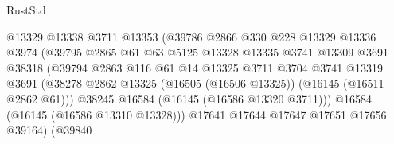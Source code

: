 \begin{lexlean}{RustStd}
\begin{coremodule}
                                        @13329
                                        @13338
                                        @3711
                                        @13353
                                        (@39786
                                          @2866
                                          @330
                                          @228
                                          @13329
                                          @13336
                                          @3974
                                          (@39795
                                            @2865
                                            @61
                                            @63
                                            @5125
                                            @13328
                                            @13335
                                            @3741
                                            @13309
                                            @3691
                                            @38318
                                            (@39794
                                              @2863
                                              @116
                                              @61
                                              @14
                                              @13325
                                              @3711
                                              @3704
                                              @3741
                                              @13319
                                              @3691
                                              (@38278
                                                @2862
                                                @13325
                                                (@16505 (@16506 @13325))
                                                (@16145 (@16511 @2862 @61)))
                                              @38245
                                              @16584
                                              (@16145 (@16586 @13320 @3711)))
                                            @16584
                                            (@16145 (@16586 @13310 @13328)))
                                          @17641
                                          @17644
                                          @17647
                                          @17651
                                          @17656
                                          @39164)
                                        (@39840

\end{coremodule}
\end{lexlean}
